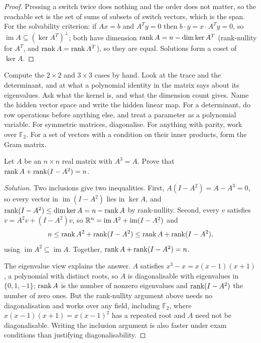 \begin{proof}
Pressing a switch twice does nothing and the order does not matter, so the reachable set is the set of sums of subsets of switch vectors, which is the span. For the solvability criterion: if $Ax=b$ and $A^Ty=0$ then $b\cdot y=x\cdot A^Ty=0$, so $\operatorname{im}A\subseteq(\ker A^T)^\perp$; both have dimension $\operatorname{rank} A=n-\dim\ker A^T$ (rank-nullity for $A^T$, and $\operatorname{rank} A=\operatorname{rank} A^T$), so they are equal. Solutions form a coset of $\ker A$.
\end{proof}

\begin{firstmoves}
Compute the $2\times2$ and $3\times3$ cases by hand. Look at the trace and the determinant, and at what a polynomial identity in the matrix says about its eigenvalues. Ask what the kernel is, and what the dimension count gives. Name the hidden vector space and write the hidden linear map. For a determinant, do row operations before anything else, and treat a parameter as a polynomial variable. For symmetric matrices, diagonalise. For anything with parity, work over $\mathbb F_2$. For a set of vectors with a condition on their inner products, form the Gram matrix.
\end{firstmoves}

\begin{example}
Let $A$ be an $n\times n$ real matrix with $A^3=A$. Prove that $\operatorname{rank} A+\operatorname{rank}(I-A^2)=n$.
\end{example}

\begin{proof}[Solution]
Two inclusions give two inequalities. First, $A(I-A^2)=A-A^3=0$, so every vector in $\operatorname{im}(I-A^2)$ lies in $\ker A$, and $\operatorname{rank}(I-A^2)\le\dim\ker A=n-\operatorname{rank} A$ by rank-nullity. Second, every $v$ satisfies $v=A^2v+(I-A^2)v$, so $\mathbb{R}^n=\operatorname{im}A^2+\operatorname{im}(I-A^2)$ and
\[
n\le\operatorname{rank} A^2+\operatorname{rank}(I-A^2)\le\operatorname{rank} A+\operatorname{rank}(I-A^2),
\]
using $\operatorname{im}A^2\subseteq\operatorname{im}A$. Together, $\operatorname{rank} A+\operatorname{rank}(I-A^2)=n$.

The eigenvalue view explains the answer. $A$ satisfies $x^3-x=x(x-1)(x+1)$, a polynomial with distinct roots, so $A$ is diagonalisable with eigenvalues in $\{0,1,-1\}$; $\operatorname{rank} A$ is the number of nonzero eigenvalues and $\operatorname{rank}(I-A^2)$ the number of zero ones. But the rank-nullity argument above needs no diagonalisation and works over any field, including $\mathbb F_2$, where $x(x-1)(x+1)=x(x-1)^2$ has a repeated root and $A$ need not be diagonalisable. Writing the inclusion argument is also faster under exam conditions than justifying diagonalisability.
\end{proof}

